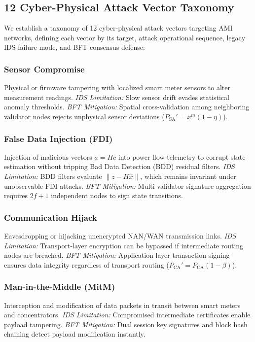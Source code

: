 \documentclass[10pt,twocolumn,journal]{IEEEtran}
\begin{document}
\subsection{12 Cyber-Physical Attack Vector Taxonomy}
We establish a taxonomy of 12 cyber-physical attack vectors targeting AMI networks, defining each vector by its target, attack operational sequence, legacy IDS failure mode, and BFT consensus defense:

\subsubsection{Sensor Compromise} Physical or firmware tampering with localized smart meter sensors to alter measurement readings. \emph{IDS Limitation:} Slow sensor drift evades statistical anomaly thresholds. \emph{BFT Mitigation:} Spatial cross-validation among neighboring validator nodes rejects unphysical sensor deviations ($P_{\text{SA}}' = x^m (1 - \eta)$).

\subsubsection{False Data Injection (FDI)} Injection of malicious vectors $a = H c$ into power flow telemetry to corrupt state estimation without tripping Bad Data Detection (BDD) residual filters. \emph{IDS Limitation:} BDD filters evaluate $\|z - H\hat{x}\|$, which remains invariant under unobservable FDI attacks. \emph{BFT Mitigation:} Multi-validator signature aggregation requires $2f+1$ independent nodes to sign state transitions.

\subsubsection{Communication Hijack} Eavesdropping or hijacking unencrypted NAN/WAN transmission links. \emph{IDS Limitation:} Transport-layer encryption can be bypassed if intermediate routing nodes are breached. \emph{BFT Mitigation:} Application-layer transaction signing ensures data integrity regardless of transport routing ($P_{\text{CA}}' = P_{\text{CA}} (1 - \beta)$).

\subsubsection{Man-in-the-Middle (MitM)} Interception and modification of data packets in transit between smart meters and concentrators. \emph{IDS Limitation:} Compromised intermediate certificates enable payload tampering. \emph{BFT Mitigation:} Dual session key signatures and block hash chaining detect payload modification instantly.
\end{document}
